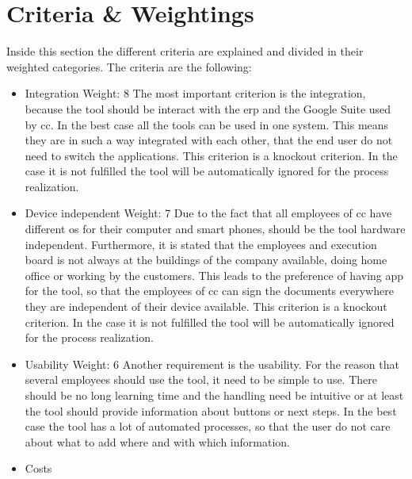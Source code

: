 \section{Criteria \& Weightings} \label{sec:criteria}
Inside this section the different criteria are explained and divided in their
weighted categories. The criteria are the following:
\begin{itemize}
	\item Integration \newline
	Weight: 8 \newline
		The most important criterion is the integration, because the tool should be interact with the \gls{erp} and the Google Suite used by \gls{cc}. In the best case all the tools can be used in one system. This means they are in such a way integrated with each other, that the end user do not need to switch the applications. \newline
		This criterion is a knockout criterion. In the case it is not fulfilled the tool will be automatically ignored for the process realization. 
	\item Device independent \newline
	Weight: 7 \newline
	Due to the fact that all employees of \gls{cc} have different \gls{os} for their computer and smart phones, should be the tool hardware independent. Furthermore, it is stated that the employees and execution board is not always at the buildings of the company available, doing home office or working by the customers. This leads to the preference of having \gls{app} for the tool, so that the employees of \gls{cc} can sign the documents everywhere they are independent of their device available.\newline
	This criterion is a knockout criterion. In the case it is not fulfilled the tool will be automatically ignored for the process realization. 
	\item Usability \newline
	Weight: 6 \newline
	Another requirement is the usability. For the reason that several employees should use the tool, it need to be simple to use. There should be no long learning time and the handling need be intuitive or at least the tool should provide information about buttons or next steps. In the best case the tool has a lot of automated processes, so that the user do not care about what to add where and with which information.
	\item Costs \newline

\end{itemize}
